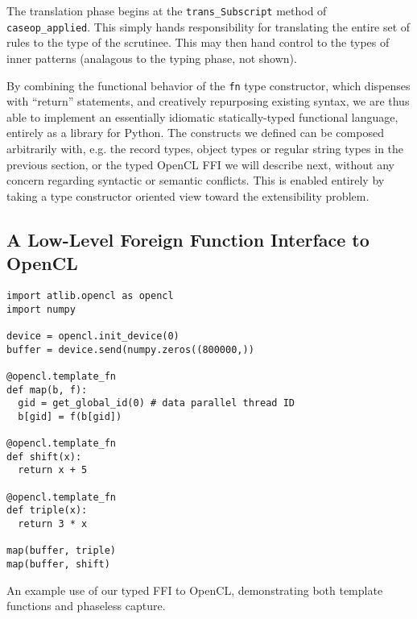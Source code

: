 \documentclass[9pt]{sigplanconf}
\newcommand{\lstinlinep}[1]{\lstinline[language=Python,basicstyle=\ttfamily\small,deletendkeywords={tuple,buffer,map}]{#1}}
\begin{document}
The translation phase begins at the \lstinlinep{trans_Subscript} method of \lstinlinep{caseop_applied}. This simply hands responsibility for translating the entire set of rules to the type of the scrutinee. This may then hand control to the types of inner patterns (analagous to the typing phase, not shown). 

By combining the functional behavior of the \lstinlinep{fn} type constructor, which dispenses with ``return'' statements, and creatively repurposing existing syntax, we are thus able to implement an essentially idiomatic statically-typed functional language, entirely as a library for Python. The constructs we defined can be composed arbitrarily with, e.g. the record types, object types or regular string types in the previous section, or the typed OpenCL FFI we will describe next, without any concern regarding syntactic or semantic conflicts. This is enabled entirely by taking a type constructor oriented view toward the extensibility problem. 

\subsection{A Low-Level Foreign Function Interface to OpenCL} 

\begin{codelisting}[t]
\begin{lstlisting}
import atlib.opencl as opencl
import numpy

device = opencl.init_device(0)
buffer = device.send(numpy.zeros((800000,))

@opencl.template_fn
def map(b, f):
  gid = get_global_id(0) # data parallel thread ID
  b[gid] = f(b[gid])

@opencl.template_fn
def shift(x):
  return x + 5

@opencl.template_fn
def triple(x):
  return 3 * x

map(buffer, triple)
map(buffer, shift)
\end{lstlisting}
\caption{An example use of our typed FFI to OpenCL, demonstrating both template functions and phaseless capture.}
\label{example-opencl}
\end{codelisting}
\end{document}
